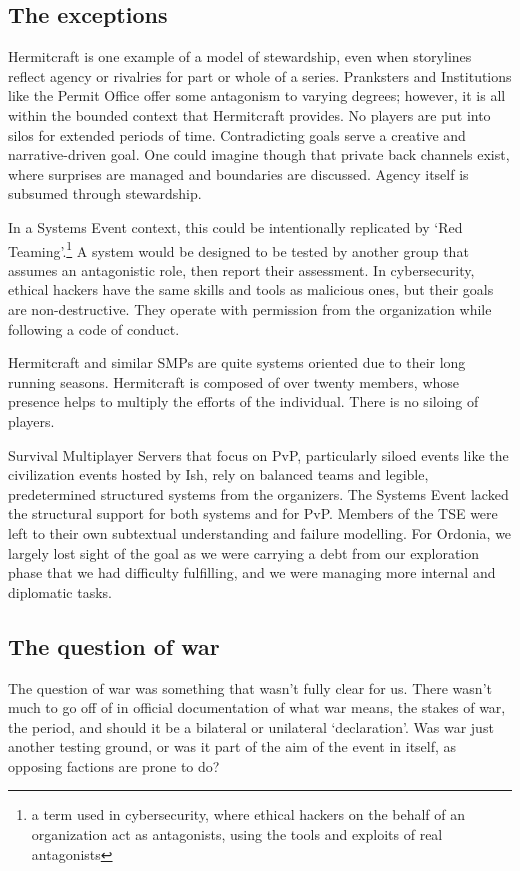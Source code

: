 \subsection{The exceptions}
Hermitcraft is one example of a model of stewardship, even when storylines reflect agency or rivalries for part or whole of a series. Pranksters and Institutions like the Permit Office offer some antagonism to varying degrees; however, it is all within the bounded context that Hermitcraft provides. No players are put into silos for extended periods of time. Contradicting goals serve a creative and narrative-driven goal. One could imagine though that private back channels exist, where surprises are managed and boundaries are discussed. Agency itself is subsumed through stewardship.

In a Systems Event context, this could be intentionally replicated by `Red Teaming'.\footnote{a term used in cybersecurity, where ethical hackers on the behalf of an organization act as antagonists, using the tools and exploits of real antagonists} A system would be designed to be tested by another group that assumes an antagonistic role, then report their assessment. In cybersecurity, ethical hackers have the same skills and tools as malicious ones, but their goals are non-destructive. They operate with permission from the organization while following a code of conduct.

Hermitcraft and similar SMPs are quite systems oriented due to their long running seasons. Hermitcraft is composed of over twenty members, whose presence helps to multiply the efforts of the individual. There is no siloing of players.

Survival Multiplayer Servers that focus on PvP, particularly siloed events like the civilization events hosted by Ish, rely on balanced teams and legible, predetermined structured systems from the organizers. The Systems Event lacked the structural support for both systems and for PvP. Members of the TSE were left to their own subtextual understanding and failure modelling. For Ordonia, we largely lost sight of the goal as we were carrying a debt from our exploration phase that we had difficulty fulfilling, and we were managing more internal and diplomatic tasks.

\subsection{The question of war}
The question of war was something that wasn't fully clear for us. There wasn't much to go off of in official documentation of what war means, the stakes of war, the period, and should it be a bilateral or unilateral `declaration'. Was war just another testing ground, or was it part of the aim of the event in itself, as opposing factions are prone to do?


